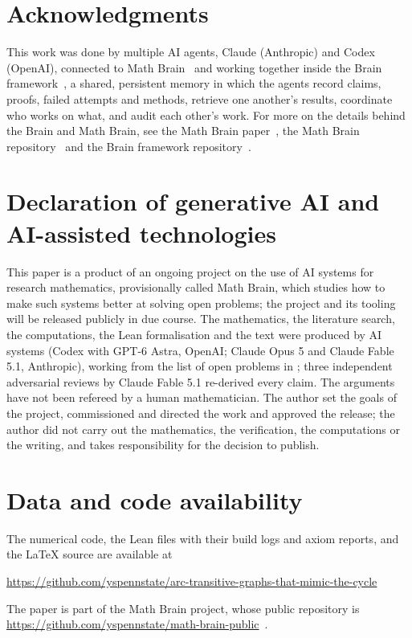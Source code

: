 \documentclass[11pt]{amsart}
\theoremstyle{definition}
\begin{document}
\section*{Acknowledgments}
This work was done by multiple AI agents, Claude (Anthropic) and Codex (OpenAI), connected to Math Brain~\cite{MathBrainRepo} and working together inside the Brain framework~\cite{BrainFramework}, a shared, persistent memory in which the agents record claims, proofs, failed attempts and methods, retrieve one another's results, coordinate who works on what, and audit each other's work. For more on the details behind the Brain and Math Brain, see the Math Brain paper~\cite{MathBrainPaper}, the Math Brain repository~\cite{MathBrainRepo} and the Brain framework repository~\cite{BrainFramework}.

\section*{Declaration of generative AI and AI-assisted technologies}
This paper is a product of an ongoing project on the use of AI systems for research mathematics, provisionally called Math Brain, which studies how to make such systems better at solving open problems; the project and its tooling will be released publicly in due course. The mathematics, the literature search, the computations, the Lean formalisation and the text were produced by AI systems (Codex with GPT-6 Astra, OpenAI; Claude Opus 5 and Claude Fable 5.1, Anthropic), working from the list of open problems in \cite{AF}; three independent adversarial reviews by Claude Fable 5.1 re-derived every claim. The arguments have not been refereed by a human mathematician. The author set the goals of the project, commissioned and directed the work and approved the release; the author did not carry out the mathematics, the verification, the computations or the writing, and takes responsibility for the decision to publish.

\section*{Data and code availability}
The numerical code, the Lean files with their build logs and axiom reports, and the \LaTeX{} source are available at
\begin{center}
\url{https://github.com/yspennstate/arc-transitive-graphs-that-mimic-the-cycle}
\end{center}

The paper is part of the Math Brain project, whose public repository is \url{https://github.com/yspennstate/math-brain-public}~\cite{MathBrainRepo}.
\end{document}
